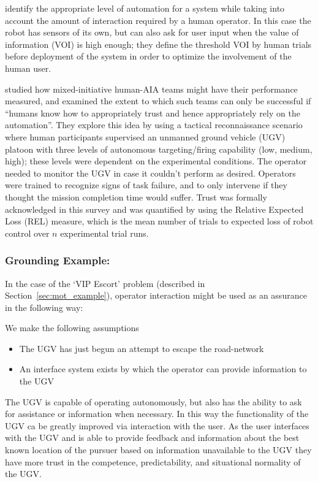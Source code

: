 \citet{Kaupp2008-yr,Kaupp2005-pk} identify the appropriate level of automation for a system while taking into account the amount of interaction required by a human operator. In this case the robot has sensors of its own, but can also ask for user input when the value of information (VOI) is high enough; they define the threshold VOI by human trials before deployment of the system in order to optimize the involvement of the human user.

\citet{Freedy2007-sg} studied how mixed-initiative human-AIA teams might have their performance measured, and examined the extent to which such teams can only be successful if ``humans know how to appropriately trust and hence appropriately rely on the automation''. 
They explore this idea by using a tactical reconnaissance scenario where human participants supervised an unmanned ground vehicle (UGV)  platoon with three levels of autonomous targeting/firing capability (low, medium, high); these levels were dependent on the experimental conditions. The operator needed to monitor the UGV in case it couldn't perform as desired.
Operators were trained to recognize signs of task failure, and to only intervene if they thought the mission completion time would suffer. Trust was formally acknowledged in this survey and was quantified by using the Relative Expected Loss (REL) measure, which is the mean number of trials to expected loss of robot control over $n$ experimental trial runs. 

\subsubsection{Grounding Example:}
In the case of the `VIP Escort' problem (described in Section~\ref{sec:mot_example}), operator interaction might be used as an assurance in the following way:

We make the following assumptions

\begin{itemize}
    \item The UGV has just begun an attempt to escape the road-network
    \item An interface system exists by which the operator can provide information to the UGV
\end{itemize}

The UGV is capable of operating autonomously, but also has the ability to ask for assistance or information when necessary. In this way the functionality of the UGV ca be greatly improved via interaction with the user. As the user interfaces with the UGV and is able to provide feedback and information about the best known location of the pursuer based on information unavailable to the UGV they have more trust in the competence, predictability, and situational normality of the UGV.

